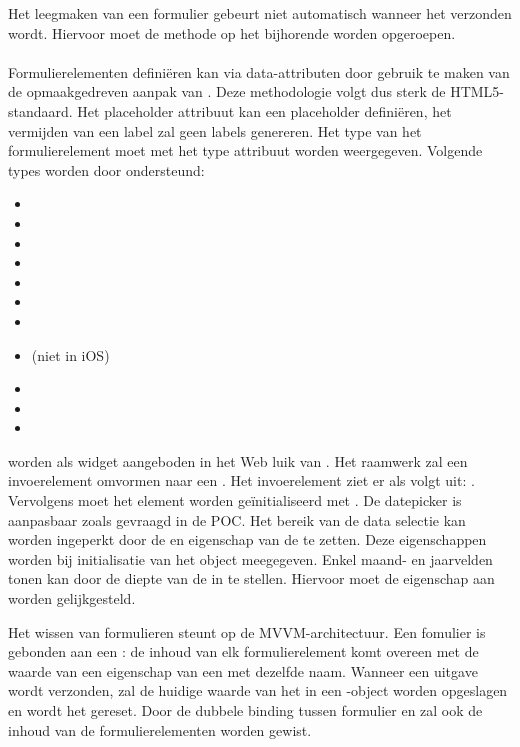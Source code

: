Het leegmaken van een formulier gebeurt niet automatisch wanneer het verzonden wordt.
Hiervoor moet de  methode op het bijhorende  worden opgeroepen.

\paragraph{\kendo}
 Formulierelementen definiëren kan via data-attributen door gebruik te maken van de opmaakgedreven aanpak van \kendo.
 Deze methodologie volgt dus sterk de HTML5-standaard.
 Het placeholder attribuut kan een placeholder definiëren,  het vermijden van een label zal geen labels genereren.
 Het type van het formulierelement moet met het type attribuut worden weergegeven.
 Volgende types worden door \kendo{} ondersteund:
 \begin{itemize}
  \item {}
  \item {}
  \item {}
  \item {}
  \item {}
  \item {}
  \item {}
  \item {} (niet in iOS)
  \item {}
  \item {} 
  \item {}
 \end{itemize}

  worden als widget aangeboden in het Web luik van \kendo{}.
 Het raamwerk zal een invoerelement omvormen naar een .
 Het invoerelement ziet er als volgt uit: .  
 Vervolgens moet het element worden geïnitialiseerd met .
 De datepicker is aanpasbaar zoals gevraagd in de POC.
 Het bereik van de data selectie kan worden ingeperkt door de  en  eigenschap van de  te zetten.
 Deze eigenschappen worden bij initialisatie van het object meegegeven.
 Enkel maand- en jaarvelden tonen kan door de diepte van de  in te stellen.
 Hiervoor moet de eigenschap  aan  worden gelijkgesteld.
 
 Het wissen van formulieren steunt op de MVVM-architectuur.
 Een fomulier is gebonden aan een :  de inhoud van elk formulierelement komt overeen met de waarde van een eigenschap van een  met dezelfde naam.
 Wanneer een uitgave wordt verzonden, zal de huidige waarde van het  in een \js-object worden opgeslagen en wordt het  gereset.
 Door de dubbele binding tussen formulier en  zal ook de inhoud van de formulierelementen worden gewist.
 
